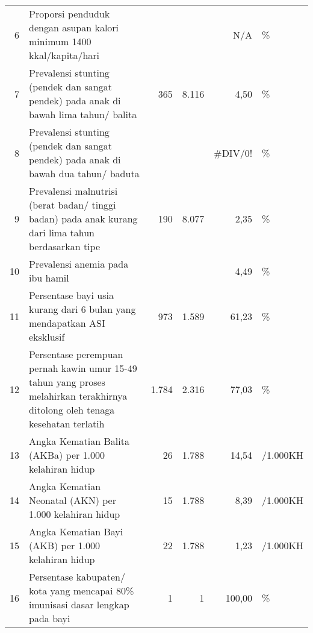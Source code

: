 \begin{center}
\begin{longtable}{rY{12em}rrrY{6em}}
                   6 & Proporsi penduduk dengan asupan kalori minimum 1400 kkal/kapita/hari                                                           &         &         &      N/A & \%                  \\
                   7 & Prevalensi stunting (pendek dan sangat pendek) pada anak di bawah lima tahun/ balita                                           &     365 &   8.116 &     4,50 & \%                  \\
                    8 & Prevalensi stunting (pendek dan sangat pendek) pada anak di bawah dua tahun/ baduta                                            &         &         & \#DIV/0! & \%                  \\
                   9 & Prevalensi malnutrisi (berat badan/ tinggi badan) pada anak kurang dari lima tahun berdasarkan tipe                            &     190 &   8.077 &     2,35 & \%                  \\
                   10 & Prevalensi anemia pada ibu hamil                                                                                               &         &         & 4,49 & \%                  \\
                   11 & Persentase bayi usia kurang dari 6 bulan yang mendapatkan ASI eksklusif                                                        &     973 &   1.589 &    61,23 & \%                  \\
                   12 & Persentase perempuan pernah kawin umur 15-49 tahun yang proses melahirkan terakhirnya ditolong oleh tenaga kesehatan terlatih  &   1.784 &   2.316 &    77,03 & \%                  \\
                   13 & Angka Kematian Balita (AKBa) per 1.000 kelahiran hidup                                                                         &      26 &   1.788 &    14,54 & /1.000KH            \\
                   14 & Angka Kematian Neonatal (AKN) per 1.000 kelahiran hidup                                                                        &      15 &   1.788 &     8,39 & /1.000KH            \\
                   15 & Angka Kematian Bayi (AKB) per 1.000 kelahiran hidup                                                                            &      22 &   1.788 &     1,23 & /1.000KH            \\
                   16 & Persentase kabupaten/ kota yang mencapai 80\% imunisasi dasar lengkap pada bayi                                                &       1 &       1 &   100,00 & \%                  \\

\end{longtable}
\end{center}
